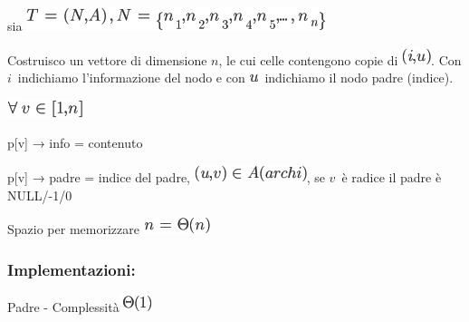 \documentclass{article}
\begin{document}
{}

{}

{}

{}

{sia }\includegraphics{images/image100.png}

{Costruisco un vettore di dimensione
}$n${, le cui celle contengono copie di
}\includegraphics{images/image101.png}{. Con
}$i${~indichiamo l'informazione del
nodo e con }\includegraphics{images/image103.png}{~indichiamo il nodo
padre (indice).}

{}

\includegraphics{images/image104.png}

{p{[}v{]} → info = contenuto}

{p{[}v{]} → padre = indice del padre,
}\includegraphics{images/image105.png}{, se
}$v${~è radice il padre è NULL/-1/0}

{}

{Spazio per memorizzare }\includegraphics{images/image106.png}

{}

\hypertarget{h.ncrwkhkrovb2}{\subsubsection{\texorpdfstring{{Implementazioni:}}{Implementazioni:}}\label{h.ncrwkhkrovb2}}

{Padre - }{Complessità}\includegraphics{images/image107.png}

\protect\hypertarget{t.13d3d44b5647536d159823e4ed75c88728308b7e}{}{}\protect\hypertarget{t.5}{}{}
\end{document}
